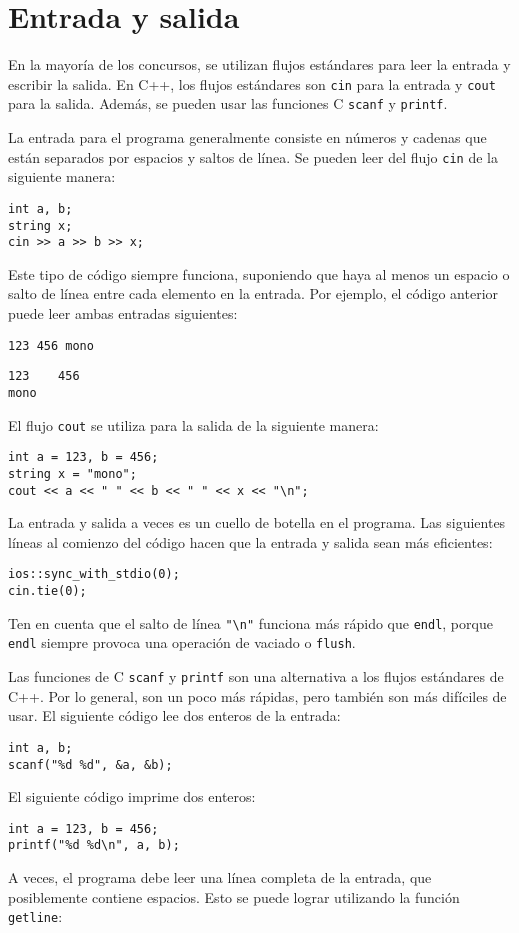 \section{Entrada y salida}


En la mayoría de los concursos, se utilizan flujos estándares
para leer la entrada y escribir la salida.
En C++, los flujos estándares son
\texttt{cin} para la entrada y \texttt{cout} para la salida.
Además, se pueden usar las funciones C
\texttt{scanf} y \texttt{printf}.

La entrada para el programa generalmente consiste en
números y cadenas que están separados por
espacios y saltos de línea.
Se pueden leer del flujo \texttt{cin}
de la siguiente manera:

\begin{lstlisting}
int a, b;
string x;
cin >> a >> b >> x;
\end{lstlisting}

Este tipo de código siempre funciona,
suponiendo que haya al menos un espacio
o salto de línea entre cada elemento en la entrada.
Por ejemplo, el código anterior puede leer
ambas entradas siguientes:
\begin{lstlisting}
123 456 mono
\end{lstlisting}
\begin{lstlisting}
123    456
mono
\end{lstlisting}
El flujo \texttt{cout} se utiliza para la salida
de la siguiente manera:
\begin{lstlisting}
int a = 123, b = 456;
string x = "mono";
cout << a << " " << b << " " << x << "\n";
\end{lstlisting}

La entrada y salida a veces
es un cuello de botella en el programa.
Las siguientes líneas al comienzo del código
hacen que la entrada y salida sean más eficientes:

\begin{lstlisting}
ios::sync_with_stdio(0);
cin.tie(0);
\end{lstlisting}

Ten en cuenta que el salto de línea \texttt{"\textbackslash n"}
funciona más rápido que \texttt{endl},
porque \texttt{endl} siempre provoca
una operación de vaciado o \texttt{flush}.

Las funciones de C \texttt{scanf}
y \texttt{printf} son una alternativa
a los flujos estándares de C++.
Por lo general, son un poco más rápidas,
pero también son más difíciles de usar.
El siguiente código lee dos enteros de la entrada:
\begin{lstlisting}
int a, b;
scanf("%d %d", &a, &b);
\end{lstlisting}
El siguiente código imprime dos enteros:
\begin{lstlisting}
int a = 123, b = 456;
printf("%d %d\n", a, b);
\end{lstlisting}
A veces, el programa debe leer una línea completa
de la entrada, que posiblemente contiene espacios.
Esto se puede lograr utilizando la
función \texttt{getline}:


